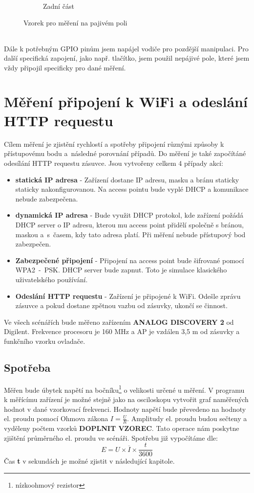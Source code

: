 \documentclass[a4paper, 12pt]{report}
\begin{document}
\begin{figure}[h!]
\begin{subfigure}[b]{0.4\linewidth}
            \caption{Zadní část}
        \end{subfigure}
        \caption{Vzorek pro měření na pajivém poli}
        \label{fig:zapojeni_esp32_vzorek}
    \end{figure}\\
    Dále k potřebným GPIO pinům jsem napájel vodiče pro pozdější manipulaci. Pro další specifická zapojení, jako např. tlačítko, jsem použil nepájivé pole, které jsem vždy připojil specificky pro dané měření.\\


    \section{Měření připojení k WiFi a odeslání HTTP requestu}
    \label{sec:wifi}
    Cílem měření je zjistění rychlostí a spotřeby připojení různými způsoby k přístupovému bodu a~následné porovnání případů. Do měření je také započítáné odesílání HTTP requestu zásuvce. Jsou vytvořeny celkem 4 případy akcí:
    \begin{itemize}
        \item \textbf{statická IP adresa} - Zařízení dostane IP adresu, masku a bránu staticky staticky nakonfigurovanou. Na access pointu bude vyplé DHCP a komunikace nebude zabezpečena.
        \item \textbf{dynamická IP adresa} - Bude využit DHCP protokol, kde zařízení požádá DHCP server o IP adresu, kterou mu access point přidělí společně s bránou, maskou a~s~časem, kdy tato adresa platí. Při měření nebude přístupový bod zabezpečen.
        \item \textbf{Zabezpečené připojení} - Připojení na access point bude šifrované pomocí WPA2~-~PSK. DHCP server bude zapnut. Toto je simulace klasického uživatelského používání.
        \item \textbf{Odeslání HTTP requestu} - Zařízení je připojené k WiFi. Odešle zprávu zásuvce a pokud dostane zpětnou vazbu od zásuvky, ukončí se činnost.
    \end{itemize}
    Ve všech scénářích bude měřeno zařízením \textbf{ANALOG DISCOVERY 2} od Digilent. Frekvence procesoru je 160 \si{MHz} a AP je vzdálen 3,5 \si{m} od zásuvky a funkčního vzorku ovladače.

    \subsection{Spotřeba}
    \label{subsec:wifi-spotreba}
    Měřen bude úbytek napětí na bočníku\footnote{nízkoohmový rezistor} o velikosti určené u měření. V programu k měřícímu zařízení je možné stejně jako na osciloskopu vytvořit graf naměřených hodnot v dané vzorkovací frekvenci. Hodnoty napětí bude převedeno na hodnoty el. proudu pomocí Ohmova zákona $I = \frac{U}{R}$. Amplitudy el. proudu budou sečteny a vyděleny počtem vzorků \textbf{DOPLNIT VZOREC}. Tato operace nám poskytne zjištění průměrného el. proudu ve scénáři. Spotřebu již vypočítáme dle:
    \[E = U \times \overline{I} \times \frac{t}{3600}\]
    Čas \textbf{t} v sekundách je možné zjistit v následující kapitole.
\end{document}
